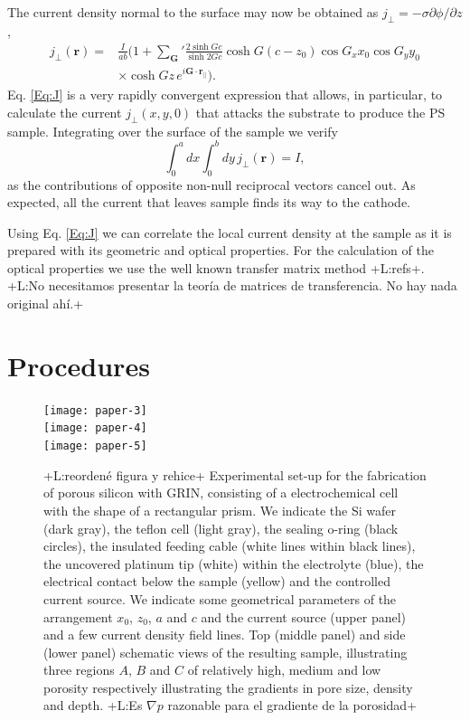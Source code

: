 \documentclass{article}
\newcommand{\notaL}[1]{{\color{blue}+L:#1+}}
\begin{document}
The current density normal to the surface may now be obtained as
$j_\perp=-\sigma\partial\phi/\partial z$,
\begin{equation}
  \label{Eq:J}
  \begin{split}
    j_\perp(\bm r) =& \frac{I}{ab}\biggl(1+{\sum_{\bm G}}'\frac{2\sinh
      Gc}{\sinh 2Gc}\cosh G(c-z_0)\cos G_x x_0 \cos G_y y_0\\
    &\times \cosh Gz\, e^{i\bm G\cdot\bm r_\|}\biggr).
  \end{split}
\end{equation}
Eq. \eqref{Eq:J} is a very rapidly convergent expression that allows,
in particular, to calculate the current $j_\perp(x,y,0)$ that attacks
the substrate to produce the PS sample.
Integrating over the surface of the sample we verify
\begin{equation}
  \label{eq:intj}
  \int_0^adx\int_0^bdy\,j_\perp(\bm r)=I,
\end{equation}
as the contributions of opposite non-null reciprocal vectors cancel
out. As expected, all the current that leaves sample finds
its way to the cathode.

Using Eq. \eqref{Eq:J} we can correlate the local current density at
the sample as it is prepared with its geometric and optical
properties. For the calculation of the optical properties we use the
well known transfer matrix method \notaL{refs}.
\notaL{No necesitamos presentar la teoría de matrices de
  transferencia. No hay nada original ahí.}


\section{Procedures}
\label{sec:procedures}
\begin{figure}
  \centering
  \texttt{[image: paper-3]}\\[12pt]
  \texttt{[image: paper-4]}\\[12pt]
  \texttt{[image: paper-5]}

  \caption{\notaL{reordené figura y rehice} Experimental set-up for
    the fabrication of porous silicon with GRIN, consisting of a
    electrochemical cell with the shape of a
    rectangular prism. We indicate the Si wafer (dark
    gray), the teflon cell (light gray), the sealing o-ring (black
    circles), the insulated feeding cable (white lines within black
    lines), the uncovered platinum tip (white) within the
    electrolyte (blue), the electrical contact below the sample
    (yellow) and the controlled current source. We indicate some geometrical
    parameters of the arrangement $x_0$, $z_0$, $a$ and $c$
    and the current source (upper panel) and a few current density
    field lines. Top (middle panel) and
    side (lower panel) schematic views of the resulting sample,
    illustrating three regions $A$, $B$ and $C$ of relatively high, medium and
    low porosity respectively illustrating the gradients in pore
    size, density and depth. \notaL{Es $\nabla p$ razonable para el
      gradiente de la porosidad}}
  \label{fig:DE1}
\end{figure}
\end{document}

